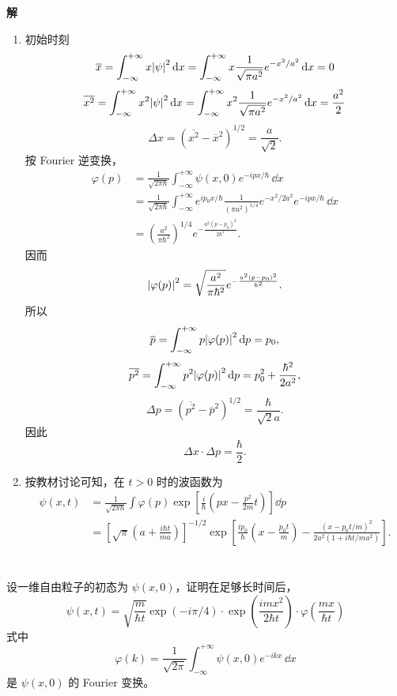 \documentclass[10pt,a4paper]{article}
\begin{document}
\vspace{0.5cm}

\noindent\textbf{解}
\begin{enumerate}[label=(\arabic*)]
  \item 初始时刻
  \[
  \overline x = \int_{-\infty}^{+\infty} x\abs{\psi}^2\, \dd x
  = \int_{-\infty}^{+\infty} x\frac{1}{\sqrt{\pi a^2}}e^{-x^2/a^2}\, \dd x = 0
  \]
  \[
  \overline{x^2} = \int_{-\infty}^{+\infty}x^2\abs{\psi}^2\, \dd x
  = \int_{-\infty}^{+\infty}x^2\frac{1}{\sqrt{\pi a^2}}e^{-x^2/a^2}\, \dd x = \frac{a^2}{2}
  \]
  \[
  \Delta x = (\overline{x^2}-\overline x^2)^{1/2}=\frac{a}{\sqrt{2}}.
  \]
  按 Fourier 逆变换，
  \begin{align*}
    \varphi(p)&=\frac{1}{\sqrt{2\pi\hbar}}\int_{-\infty}^{+\infty}\psi(x,0)e^{-ipx/\hbar}\, \dd x \\
    &= \frac{1}{\sqrt{2\pi\hbar}}\int_{-\infty}^{+\infty}e^{ip_0x/\hbar}\frac{1}{(\pi a^2)^{1/4}}e^{-x^2/2a^2}e^{-ipx/\hbar}\, \dd x \\
    &= \left(\frac{a^2}{\pi\hbar^2}\right)^{1/4}
    e^{-\frac{a^2(p-p_0)^2}{2\hbar^2}}.
  \end{align*}
  因而
  \[
  \abs{\varphi(p)}^2 = \sqrt{\frac{a^2}{\pi\hbar^2}}e^{-\frac{a^2(p-p_0)^2}{\hbar^2}}.
  \]
  所以
  \[
  \overline p = \int_{-\infty}^{+\infty}p\abs{\varphi(p)}^2\, \dd p = p_0,
  \]
  \[
  \overline{p^2} = \int_{-\infty}^{+\infty}p^2\abs{\varphi(p)}^2\, \dd p = p_0^2 + \frac{\hbar^2}{2a^2},
  \]
  \[
  \Delta p = (\overline{p^2}-\overline p^2)^{1/2}=\frac{\hbar}{\sqrt{2}a}.
  \]
  因此
  \[
  \Delta x\cdot\Delta p = \frac{\hbar}{2}.
  \]

  \item 按教材讨论可知，在 $t>0$ 时的波函数为
  \begin{align*}
    \psi(x,t)&=\frac{1}{\sqrt{2\pi\hbar}}\int \varphi(p)
    \exp\left[\frac{i}{\hbar}\left(px-\frac{p^2}{2m}t\right)\right]\dd p \\
    & = [\sqrt{\pi}(a+\frac{i\hbar t}{ma})]^{-1/2}
    \exp\left[\frac{i p_0}{\hbar}\left(x-\frac{p_0 t}{m}\right)
    - \frac{\left(x-p_0 t/m\right)^2}{2a^2\left(1+i\hbar t/ma^2\right)}\right].
  \end{align*}
\end{enumerate}


\section{}
设一维自由粒子的初态为 $\psi(x,0)$，证明在足够长时间后，
\[
\psi(x,t)=\sqrt{\frac{m}{\hbar t}}\exp(-i\pi/4)\cdot
\exp\left(\frac{imx^2}{2\hbar t}\right)\cdot
\varphi\left(\frac{mx}{\hbar t}\right)
\]
式中
\[
\varphi(k)=\frac{1}{\sqrt{2\pi}}\int_{-\infty}^{+\infty}\psi(x,0)e^{-ikx}\, \dd x
\]
是 $\psi(x,0)$ 的 Fourier 变换。
\end{document}
